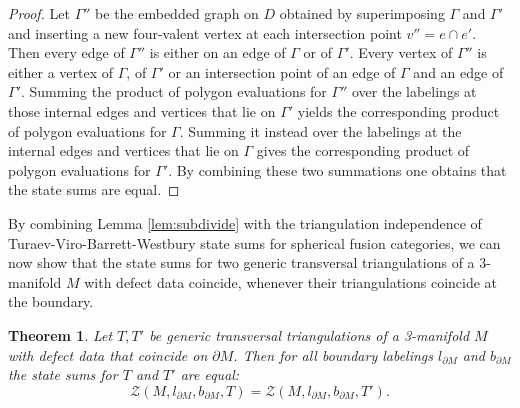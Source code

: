 \documentclass[1.5pt, a4paper]{article}
\newtheorem{theorem}{Theorem}[section]
\begin{document}
\begin{proof}
Let $\Gamma''$ be the embedded graph  on $D$
obtained by superimposing $\Gamma$ and $\Gamma'$ and inserting a new four-valent vertex at each intersection point $v''=e\cap e'$.  Then every edge of $\Gamma''$ is either on an edge of $\Gamma$ or of $\Gamma'$. Every vertex of $\Gamma''$ is either a vertex of $\Gamma$, of $\Gamma'$ or an intersection point of an edge of $\Gamma$ and an edge of $\Gamma'$.
  Summing the  product of polygon  evaluations for  $\Gamma''$ over the labelings at those  internal  edges and vertices  that lie on $\Gamma'$ 
  yields the corresponding  product of  polygon evaluations for $\Gamma$. Summing it instead over  the labelings at the internal  edges and vertices that lie on $\Gamma$ gives the corresponding  product of  polygon evaluations for $\Gamma'$. By combining these two summations one obtains that the state sums are equal. 
\end{proof}

By combining Lemma \ref{lem:subdivide} with the triangulation independence of Turaev-Viro-Barrett-Westbury state sums for spherical fusion categories, we can now show that the state sums for two generic transversal triangulations of a 3-manifold $M$ with defect data coincide, whenever their triangulations coincide at the boundary. 


\begin{theorem}\label{th:fulltopinv} Let $T,T'$ be generic transversal triangulations of a 3-manifold $M$ with defect data that coincide on $\partial M$.  Then for all boundary labelings $l_{\partial M}$  and $b_{\partial M}$   the state sums for  $T$ and $T'$ are equal:
$$
\mathcal Z(M,l_{\partial M}, b_{\partial M},T)=\mathcal Z(M, l_{\partial M}, b_{\partial M}, T').
$$
\end{theorem}
\end{document}
